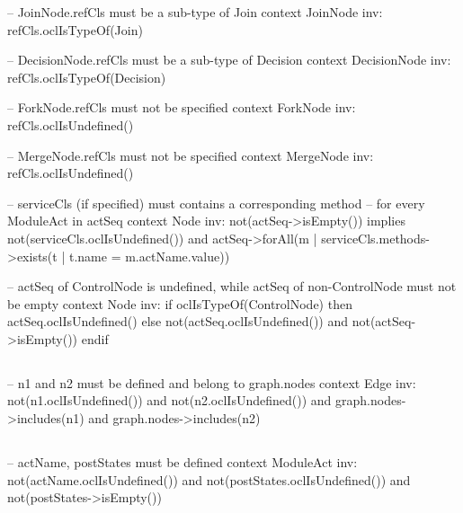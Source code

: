 \begin{lstrule}
-- JoinNode.refCls must be a sub-type of Join
context JoinNode inv:
  refCls.oclIsTypeOf(Join)

-- DecisionNode.refCls must be a sub-type of Decision
context DecisionNode inv:
  refCls.oclIsTypeOf(Decision)

-- ForkNode.refCls must not be specified
context ForkNode inv:
  refCls.oclIsUndefined()

-- MergeNode.refCls must not be specified
context MergeNode inv:
  refCls.oclIsUndefined()
\end{lstrule}

\begin{lstrule}
-- serviceCls (if specified) must contains a corresponding method 
-- for every ModuleAct in actSeq
context Node inv:
  not(actSeq->isEmpty()) implies not(serviceCls.oclIsUndefined()) and 
    actSeq->forAll(m | serviceCls.methods->exists(t | t.name = m.actName.value))
\end{lstrule}

\begin{lstrule}
-- actSeq of ControlNode is undefined, while actSeq of non-ControlNode must not be empty
context Node inv:
  if oclIsTypeOf(ControlNode) 
  then
    actSeq.oclIsUndefined()  
  else
    not(actSeq.oclIsUndefined()) and not(actSeq->isEmpty())
  endif
\end{lstrule}

%
\subsection{}
\begin{lstrule}
-- n1 and n2 must be defined and belong to graph.nodes
context Edge inv:
  not(n1.oclIsUndefined()) and not(n2.oclIsUndefined()) and 
  graph.nodes->includes(n1) and graph.nodes->includes(n2)
\end{lstrule}

%
\subsection{}
\begin{lstrule}
-- actName, postStates must be defined
context ModuleAct inv:
  not(actName.oclIsUndefined()) and 
  not(postStates.oclIsUndefined()) and not(postStates->isEmpty())
\end{lstrule}

